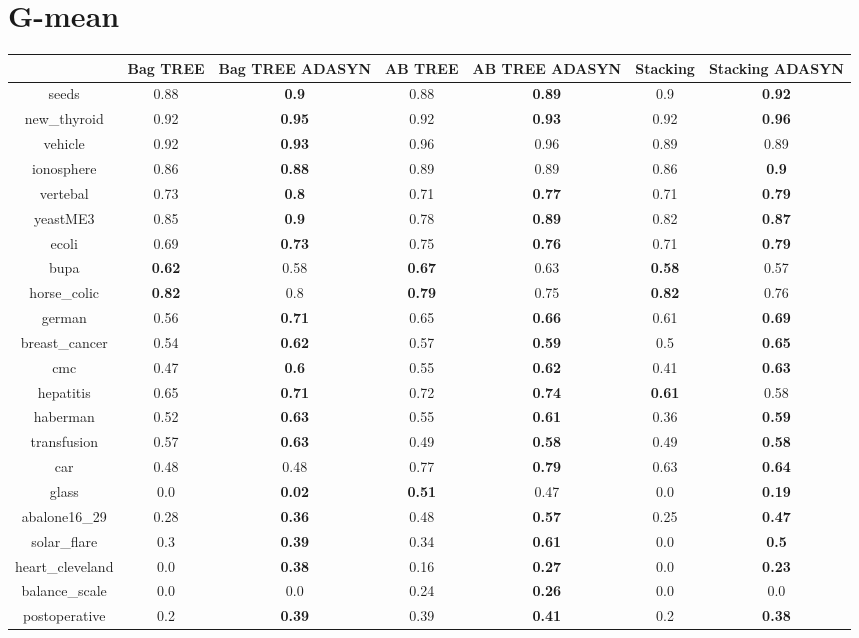\documentclass{article}%
\begin{document}
%
\section*{G{-}mean}%
\begin{tabular}{c|cccccc}%
&Bag TREE&Bag TREE ADASYN&AB TREE&AB TREE ADASYN&Stacking&Stacking ADASYN\\%
\hline%
seeds&0.88&\textbf{0.9}&0.88&\textbf{0.89}&0.9&\textbf{0.92}\\%
new\_thyroid&0.92&\textbf{0.95}&0.92&\textbf{0.93}&0.92&\textbf{0.96}\\%
vehicle&0.92&\textbf{0.93}&0.96&0.96&0.89&0.89\\%
ionosphere&0.86&\textbf{0.88}&0.89&0.89&0.86&\textbf{0.9}\\%
vertebal&0.73&\textbf{0.8}&0.71&\textbf{0.77}&0.71&\textbf{0.79}\\%
yeastME3&0.85&\textbf{0.9}&0.78&\textbf{0.89}&0.82&\textbf{0.87}\\%
ecoli&0.69&\textbf{0.73}&0.75&\textbf{0.76}&0.71&\textbf{0.79}\\%
bupa&\textbf{0.62}&0.58&\textbf{0.67}&0.63&\textbf{0.58}&0.57\\%
horse\_colic&\textbf{0.82}&0.8&\textbf{0.79}&0.75&\textbf{0.82}&0.76\\%
german&0.56&\textbf{0.71}&0.65&\textbf{0.66}&0.61&\textbf{0.69}\\%
breast\_cancer&0.54&\textbf{0.62}&0.57&\textbf{0.59}&0.5&\textbf{0.65}\\%
cmc&0.47&\textbf{0.6}&0.55&\textbf{0.62}&0.41&\textbf{0.63}\\%
hepatitis&0.65&\textbf{0.71}&0.72&\textbf{0.74}&\textbf{0.61}&0.58\\%
haberman&0.52&\textbf{0.63}&0.55&\textbf{0.61}&0.36&\textbf{0.59}\\%
transfusion&0.57&\textbf{0.63}&0.49&\textbf{0.58}&0.49&\textbf{0.58}\\%
car&0.48&0.48&0.77&\textbf{0.79}&0.63&\textbf{0.64}\\%
glass&0.0&\textbf{0.02}&\textbf{0.51}&0.47&0.0&\textbf{0.19}\\%
abalone16\_29&0.28&\textbf{0.36}&0.48&\textbf{0.57}&0.25&\textbf{0.47}\\%
solar\_flare&0.3&\textbf{0.39}&0.34&\textbf{0.61}&0.0&\textbf{0.5}\\%
heart\_cleveland&0.0&\textbf{0.38}&0.16&\textbf{0.27}&0.0&\textbf{0.23}\\%
balance\_scale&0.0&0.0&0.24&\textbf{0.26}&0.0&0.0\\%
postoperative&0.2&\textbf{0.39}&0.39&\textbf{0.41}&0.2&\textbf{0.38}\\%
\end{tabular}

%
\end{document}
